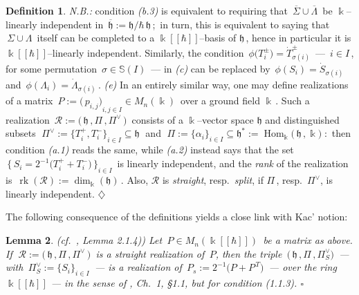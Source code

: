 \documentclass[12pt,reqno,twoside,a4paper]{amsart}
\numberwithin{equation}{section}
\newtheorem{lema}{Lemma}[subsection]
\theoremstyle{definition}
\newtheorem{definition}[lema]{Definition}
\newtheorem{free text}[lema]{}
\theoremstyle{remark}
\newcommand \rk{\operatorname{rk}}
\newcommand \Hom{\operatorname{Hom}}
\newcommand{\R}{{\mathcal R}}
\def \kh{{\Bbbk[[\hbar]]}}
\def \lieh{\mathfrak{h}}
\theoremstyle{plain}
\begin{document}
\begin{definition}
%
 \vskip5pt
%
   \textit{N.B.:}\;  condition  \textit{(b.3)\/}  is equivalent  to requiring that
   $ \, \overline{\Sigma} \cup \overline{\Lambda} \, $  be  $ \Bbbk $--linearly  independent in
   $ \, \overline{\lieh} := \lieh \Big/ \hbar\,\lieh \, $;  \,in turn, this is equivalent to saying that
   $ \, \Sigma \cup \Lambda \, $  itself can be completed to a  $ \kh $--basis  of
   $ \lieh \, $,  hence in particular it is  $ \kh $--linearly  independent.  Similarly, the condition
   $ \, \phi\big(T_i^\pm\big) = {\dot{T}}_{\sigma(i)}^\pm \, $   ---  $ \, i \in I \, $,
   for some permutation  $ \, \sigma \in \mathbb{S}(I) \, $  ---   in  \textit{(c)\/}  can be replaced by
%
 $ \, \phi(S_i) = {\dot{S}}_{\sigma(i)} \, $  and  $ \, \phi(\varLambda_i) = {\dot{\varLambda}}_{\sigma(i)} \, $.
%
 \vskip5pt
%
   \textit{(e)}\;  In an entirely similar way, one may define realizations of a matrix
   $ \, P := {\big(\, p_{i,j} \big)}_{i, j \in I} \in M_n(\Bbbk) \, $  over a ground field  $ \Bbbk \, $.
   Such a realization  $ \, \R := \big(\, \lieh \, , \Pi \, , \Pi^\vee \,\big) \, $ consists of a  $ \Bbbk $--vector  space
   $ \lieh $  and distinguished subsets  $ \; \Pi^\vee := {\big\{ T^+_i , T^-_i \big\}}_{i \in I} \! \subseteq \lieh \; $
   and  $ \; \Pi := {\big\{ \alpha_i \big\}}_{i \in I} \subseteq \lieh^* := \Hom_\Bbbk\!\big(\, \lieh \, , \Bbbk \big) \; $:
   \,then condition  \textit{(a.1)\/}  reads the same, while  \textit{(a.2)\/}  instead says that the set
   $ \, {\big\{\, S_i = 2^{-1}\big(T^+_i + T^-_i\big) \,\big\}}_{i\in I} \, $  is linearly independent, and the
   \textsl{rank\/}  of the realization is  $ \, \rk(\R) := \dim_\Bbbk(\lieh) \, $.  Also,  $ \R $  is  \textsl{straight},
   resp.\  \textsl{split},  if  $ \Pi \, $,  resp.\  $ \Pi^\vee $,  is linearly independent.   \hfill  $ \diamondsuit $
%
%
\end{definition}

\vskip7pt

   The following consequence of the definitions yields a close link with Kac' notion:

\vskip11pt

\begin{lema}  \label{lem: realiz_P => realiz_A}  \textsl{(cf.\ \cite{GG3}, Lemma 2.1.4))}
%
 Let  $ \, P \in M_n(\kh) \, $  be a matrix as above.  If  $ \; \R := \big(\, \lieh \, , \Pi \, , \Pi^\vee \,\big) \, $
 is a straight realization of  $ \, P $,  then the triple  $ \, \big(\, \lieh \, , \Pi \, , \Pi^\vee_S \big) \, $
 --- with  $ \, \Pi^\vee_S \! := {\{S_i\}}_{i \in I} \, $  ---   is a realization of  $ \, P_s := 2^{-1} \big( P + P^{\,\scriptscriptstyle T} \big) \, $
 --- over the ring  $ \kh $  ---   in the sense of  \cite{Ka1}, Ch.\ 1, \S 1.1, but for condition (1.1.3).   \hfill  $ \square $
%
\end{lema}
\end{document}
